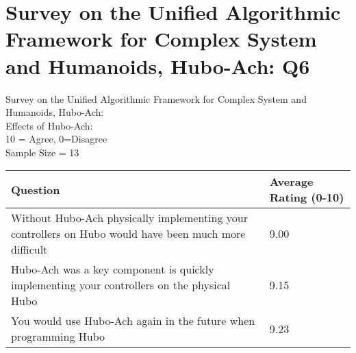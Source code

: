 \chapter{Survey on the Unified Algorithmic Framework for Complex System and Humanoids, Hubo-Ach: Q6}\label{abs:q6}
\Large
\centering
Survey on the Unified Algorithmic Framework for Complex System and Humanoids, Hubo-Ach:\\
Effects of Hubo-Ach:\\
\small
10 = Agree, 0=Disagree\\
Sample Size = 13\\
\normalsize
\begin{longtable}{|p{9cm} | p{3cm} | }
\hline
Question		&	Average Rating (0-10)	\\	\hline
\hline
\hline
Without Hubo-Ach physically implementing your controllers on Hubo would have been much more difficult	& 	9.00 \\
\hline
Hubo-Ach was a key component is quickly implementing your controllers on the physical Hubo		&	9.15 \\
\hline
You would use Hubo-Ach again in the future when programming Hubo					& 	9.23 \\
\hline

\end{longtable}

